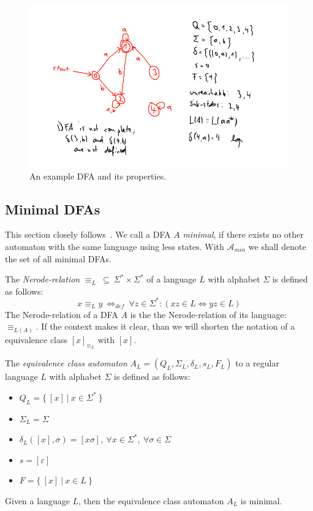 \begin{figure}
	\includegraphics[width=\linewidth]{images/dfa.png}
	\caption{An example DFA and its properties.}
	\label{fig:dfa}
\end{figure}

\subsection{Minimal DFAs}

This section closely follows~\cite[pp. 42-45]{schoening01}. We call a DFA $A$ \emph{minimal}, if there exists no other automaton with the same language using less states. With $\mathcal{A}_{min}$ we shall denote the set of all minimal DFAs.

The \emph{Nerode-relation} $\equiv_L\ \subseteq\ \Sigma^* \times \Sigma^*$ of a language $L$ with alphabet $\Sigma$ is defined as follows:
\begin{displaymath}
	x \equiv_L y\ \Leftrightarrow_{def}\ \forall z\in\Sigma^*\colon (xz\in L \Leftrightarrow yz\in L)
\end{displaymath}
The Nerode-relation of a DFA $A$ is the the Nerode-relation of its language: $\equiv_{L(A)}$. If the context makes it clear, than we will shorten the notation of a equivalence class $[x]_{\equiv_L}$ with $[x]$.

The \emph{equivalence class automaton} $A_L = (Q_L, \Sigma_L, \delta_L, s_L, F_L)$ to a regular language $L$ with alphabet $\Sigma$ is defined as follows:
\begin{itemize}
	\item $Q_L = \{\ [x]\ |\ x \in \Sigma^*\ \}$
	\item $\Sigma_L = \Sigma$
	\item $\delta_L([x], \sigma) = [x\sigma],\ \forall x\in\Sigma^*,\ \forall\sigma\in\Sigma$
	\item $s = [\varepsilon]$
	\item $F = \{\ [x]\ |\ x \in L\ \}$
\end{itemize}
\begin{theorem}
	Given a language $L$, then the equivalence class automaton $A_L$ is minimal.
\end{theorem}

